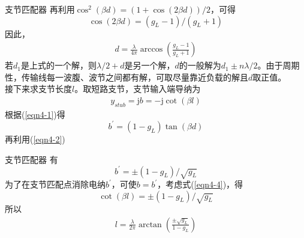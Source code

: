 \begin{frame}{支节匹配器}
  再利用$\cos^2(\beta d)=(1+\cos(2\beta d))/2$，可得
  $$\cos(2\beta d)=(g_L-1)/(g_L+1)$$
  因此，
  \begin{align}
    d=\frac{\lambda}{4\pi}\arccos\left(\frac{g_L-1}{g_L+1}\right) \label{eqn4-3}
  \end{align}
  若$d_1$是上式的一个解，则$\lambda/2+d$是另一个解，$d$的一般解为$d_1\pm n\lambda/2$。由于周期性，传输线每一波腹、波节之间都有解，可取尽量靠近负载的解且$d$取正值。\\
  接下来求支节长度$l$。取短路支节，支节输入端导纳为
  \begin{align}
    y_{stub}=\mathrm{j}b=-\mathrm{j}\cot(\beta l) \label{eqn4-4}
  \end{align}
  根据(\ref{eqn4-1})得
  $$b^{'}=(1-g_L)\tan(\beta d)$$
  再利用(\ref{eqn4-2})
\end{frame}

\begin{frame}{支节匹配器}
  有$$b^{'}=\pm(1-g_L)/\sqrt{g_L}$$
  为了在支节匹配点消除电纳$b^{'}$，可使$b=b^{'}$，考虑式(\ref{eqn4-4})，得
  $$\cot(\beta l)=\pm (1-g_L)/\sqrt{g_L}$$
  所以
  \begin{align}
    l=\frac{\lambda}{2\pi}\arctan\left(\frac{\pm\sqrt{g_L}}{1-g_L}\right) \label{eqn4-5}
  \end{align}
  
\end{frame}

